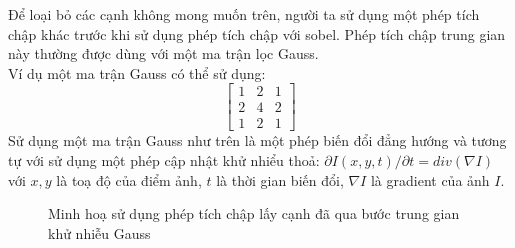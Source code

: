 Để loại bỏ các cạnh không mong muốn trên, người ta sử dụng một phép tích chập khác trước khi sử dụng phép tích chập với sobel. Phép tích chập trung gian này thường được dùng với một ma trận lọc Gauss. \\
Ví dụ một ma trận Gauss có thể sử dụng:
$$\begin{bmatrix}
1 & 2 & 1\\ 
2 & 4 & 2\\ 
1 & 2 & 1
\end{bmatrix}$$
Sử dụng một ma trận Gauss như trên là một phép biến đổi đẳng hướng và tương tự với sử dụng một phép cập nhật khử nhiểu thoả: $\partial I(x,y,t)/\partial t = div(\nabla I)$ với $x, y$ là toạ độ của điểm ảnh, $t$ là thời gian biến đổi, $\nabla I$ là gradient của ảnh $I$.\\

\begin{figure}
  \centering
  \caption{Minh hoạ sử dụng phép tích chập lấy cạnh đã qua bước trung gian khử nhiễu Gauss}
  \label{fig:gausssobel}
\end{figure}


